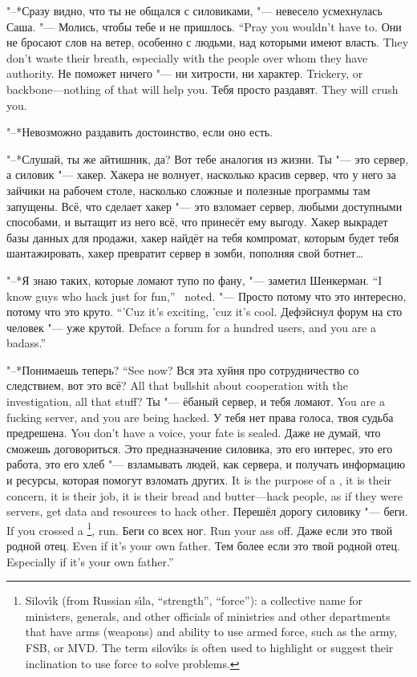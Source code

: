 "--*Сразу видно, что ты не общался с силовиками, "--- невесело усмехнулась Саша.
{"--- Молись, чтобы тебе и не пришлось.}
{``Pray you wouldn't have to.}
{Они не бросают слов на ветер, особенно с людьми, над которыми имеют власть.}
{They don't waste their breath, especially with the people over whom they have authority.}
{Не поможет ничего "--- ни хитрости, ни характер.}
{Trickery, or backbone---nothing of that will help you.}
{Тебя просто раздавят.}
{They will crush you.}

"--*Невозможно раздавить достоинство, если оно есть.

"--*Слушай, ты же айтишник, да?
Вот тебе аналогия из жизни.
Ты "--- это сервер, а силовик "--- хакер.
Хакера не волнует, насколько красив сервер, что у него за зайчики на рабочем столе, насколько сложные и полезные программы там запущены.
Всё, что сделает хакер "--- это взломает сервер, любыми доступными способами, и вытащит из него всё, что принесёт ему выгоду.
Хакер выкрадет базы данных для продажи, хакер найдёт на тебя компромат, которым будет тебя шантажировать, хакер превратит сервер в зомби, пополняя свой ботнет\ldots{}

{"--*Я знаю таких, которые ломают тупо по фану, "--- заметил Шенкерман.}
{``I know guys who hack just for fun,'' \Shenkerman\ noted.}
{"--- Просто потому что это интересно, потому что это круто.}
{``'Cuz it's exciting, 'cuz it's cool.}
{Дефэйснул форум на сто человек "--- уже крутой.}
{Deface a forum for a hundred users, and you are a badass.''}

{"--*Понимаешь теперь?}
{``See now?}
{Вся эта хуйня про сотрудничество со следствием, вот это всё?}
{All that bullshit about cooperation with the investigation, all that stuff?}
{Ты "--- ёбаный сервер, и тебя ломают.}
{You are a fucking server, and you are being hacked.}
{У тебя нет права голоса, твоя судьба предрешена.}
{You don't have a voice, your fate is sealed.}
Даже не думай, что сможешь договориться.
{Это предназначение силовика, это его интерес, это его работа, это его хлеб "--- взламывать людей, как сервера, и получать информацию и ресурсы, которая помогут взломать других.}
{It is the purpose of a \silovik, it is their concern, it is their job, it is their bread and butter---hack people, as if they were servers, get data and resources to hack other.}
{Перешёл дорогу силовику "--- беги.}
{If you crossed a \silovik\footnote{Silov\'{\i}k (from Russian s\'{\i}la, ``strength'', ``force''): a collective name for ministers, generals, and other officials of ministries and other departments that have arms (weapons) and ability to use armed force, such as the army, FSB, or MVD. The term silov\'{\i}ks is often used to highlight or suggest their inclination to use force to solve problems.}, run.}
{Беги со всех ног.}
{Run your ass off.}
{Даже если это твой родной отец.}
{Even if it's your own father.}
{Тем более если это твой родной отец.}
{Especially if it's your own father.''}

